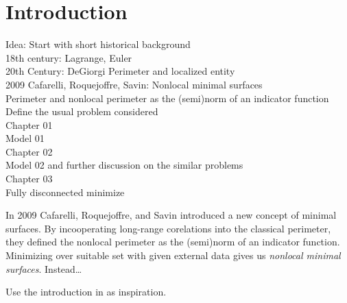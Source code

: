 \chapter{Introduction}
\label{ch:introduction}


Idea: Start with short historical background\\
18th century: Lagrange, Euler\\
20th Century: DeGiorgi Perimeter and localized entity\\
2009 Cafarelli, Roquejoffre, Savin: Nonlocal minimal surfaces\\
Perimeter and nonlocal perimeter as the (semi)norm of an indicator function\\
Define the usual problem considered\\

Chapter 01\\
Model 01\\

Chapter 02\\
Model 02 and further discussion on the similar problems\\

Chapter 03\\
Fully disconnected minimize




In 2009 Cafarelli, Roquejoffre, and Savin \cite{caffarelli2009nonlocal} introduced a new
concept of minimal surfaces. By incooperating long-range corelations into the classical
perimeter, they defined the nonlocal perimeter as the (semi)norm of an indicator function.
Minimizing over suitable set with given external data gives us \emph{nonlocal minimal
	surfaces}. Instead\ldots

Use the introduction in \cite{dipierro2012asymptotics} as inspiration.